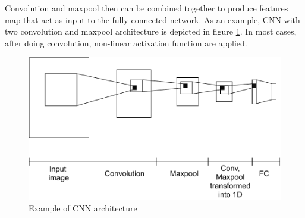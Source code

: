     Convolution and maxpool then can be combined together to produce
    features map that act as input to the fully connected network. As
    an example, CNN with two convolution and maxpool architecture is
    depicted in figure \ref{fig:cnn}. In most cases, after doing
    convolution, non-linear activation function are applied.
    \begin{figure}
        \centering
        \includegraphics[width=.8\linewidth]{images/cnn.pdf}
        \caption{Example of CNN architecture}
        \label{fig:cnn}
    \end{figure}


